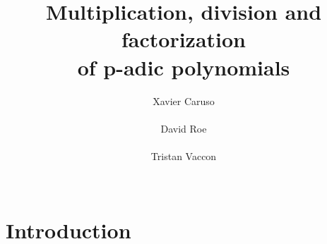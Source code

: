 \documentclass{sig-alternate-2013}
\newcommand{\RS}{\text{\rm RS}}
\begin{document}
\newtheorem{theo}{Theorem}[section]
\newtheorem{lem}[theo]{Lemma}
\newtheorem{prop}[theo]{Proposition}
\newtheorem{cor}[theo]{Corollary}
\newtheorem{quest}[theo]{Question}
\newtheorem{conj}[theo]{Conjecture}
\theoremstyle{definition}
\newtheorem{rem}[theo]{Remark}
\newtheorem{ex}[theo]{Example}
\newtheorem{deftn}[theo]{Definition}

\title{Multiplication, division and factorization\\of p-adic polynomials}

\author{
\alignauthor Xavier Caruso\\
  \\
\alignauthor David Roe \\
  \\
\alignauthor Tristan Vaccon\\
  \\
}

\maketitle

\begin{abstract}
\end{abstract}

\keywords{}

%
%

\section{Introduction}
\end{document}
